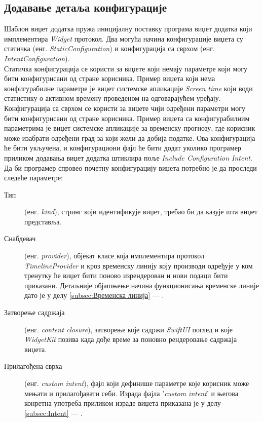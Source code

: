 \documentclass[12pt,oneside]{memoir}
\begin{document}
\subsection{Додавање детаља конфигурације}
\indent Шаблон виџет додатка пружа иницијалну поставку програма виџет додатка који имплементира \textit{Widget} протокол. Два могућа начина конфигурације виџета су статичка (енг. \textit{StaticConfiguration}) и конфигурација са сврхом (енг. \textit{IntentConfiguration}). \\
\indent Статичка конфигурација се користи за виџете који немају параметре који могу бити конфигурисани од стране корисника. Пример виџета који нема конфигурабилне параметре је виџет системске апликације \textit{Screen time} који води статистику о активном времену проведеном на одговарајућем уређају. Конфигурација са сврхом се користи за виџете чији одређени параметри могу бити конфигурисани од стране корисника. Пример виџета са конфигурабилним параметрима је виџет системске апликације за временску прогнозу, где корисник може изабрати одређени град за који жели да добија податке. Ова конфигурација ће бити укључена, и конфигурациони фајл ће бити додат уколико програмер приликом додавања виџет додатка штиклира поље \textit{Include Configuration Intent}.
\\
\indent Да би програмер спровео почетну конфигурацију виџета потребно је да проследи следеће параметре:
\begin{description}
    \item [Тип] (енг. \textit{kind}), стринг који идентификује виџет, требао би да казује шта виџет представља.
    \item [Снабдевач] (енг. \textit{provider}), објекат класе која имплементира протокол \textit{Time\-lineProvider} и кроз временску линију коју производи одређује у ком тренутку ће виџет бити поново изрендерован и нови подаци бити приказани. Детаљније објашњење начина функционисања временске линије дато је у делу \ref{subsec:Временска линија} --- .
    \item [Затворење садржаја] (енг. \textit{content closure}), затворење које садржи \textit{SwiftUI} поглед и које \textit{WidgetKit} позива када дође време за поновно рендеровање садржаја виџета.
    \item [Прилагођена сврха] (енг. \textit{custom intent}), фајл који дефинише параметре које корисник може мењати и прилагођавати себи. Израда фајла '\textit{custom intent}' и његова конретна употреба приликом израде виџета приказана је у делу \ref{subsec:Intent} --- .
\end{description}
\end{document}
